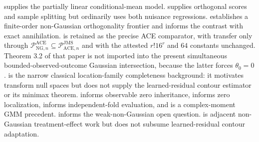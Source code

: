 \cite{Robinson1988} supplies the partially linear conditional-mean model. \cite{ChernozhukovEtAl2018DML} supplies orthogonal scores and sample splitting but ordinarily uses both nuisance regressions. \cite{MackeySyrgkanisZadik2018} establishes a finite-order non-Gaussian orthogonality frontier and informs the contrast with exact annihilation. \cite[Theorem 5.4, condition (21), and bound (22)]{JinMackeySyrgkanis2025} is retained as the precise ACE comparator, with transfer only through \(\mathcal P_{\mathrm{NG},n}^{\mathrm{ACE}}\subseteq\mathcal P_{\mathrm{ACE},n}^{\mathrm{JMS}}\) and with the attested \(r!16^r\) and \(64\) constants unchanged. Theorem 3.2 of that paper is not imported into the present simultaneous bounded-observed-outcome Gaussian intersection, because the latter forces \(\theta_0=0\). \cite{Mattner1992} is the narrow classical location-family completeness background: it motivates transform null spaces but does not supply the learned-residual contour estimator or its minimax theorem. \cite{HuShiu2022} informs observable zero inheritance, \cite{DinhGhoshTranTran2021} informs zero localization, \cite{NeweyRobins2018} informs independent-fold evaluation, and \cite{ChackoViceira2003} is a complex-moment GMM precedent. \cite{LeeMesters2024} informs the weak-non-Gaussian open question. \cite{ReizingerEtAl2025} is adjacent non-Gaussian treatment-effect work but does not subsume learned-residual contour adaptation.